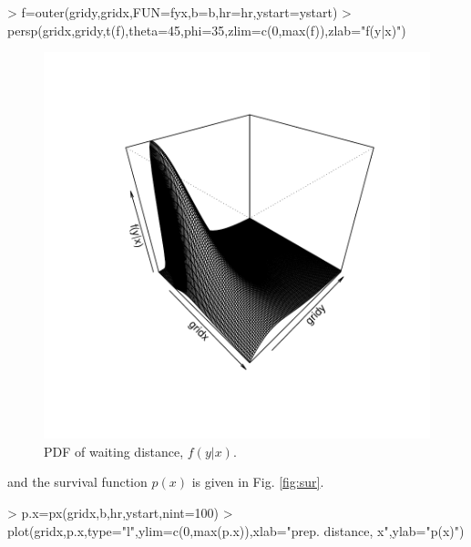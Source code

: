 \documentclass{article}
\begin{document}
\begin{Schunk}
\begin{Sinput}
> f=outer(gridy,gridx,FUN=fyx,b=b,hr=hr,ystart=ystart)
> persp(gridx,gridy,t(f),theta=45,phi=35,zlim=c(0,max(f)),zlab="f(y|x)")
\end{Sinput}
\end{Schunk}
\begin{figure}
\begin{centering}
\includegraphics{simulations-figwait}

\caption{PDF of waiting distance, $f(y|x)$.} \label{fig:wait}
\end{centering}
\end{figure}
and the survival function $p(x)$ is given in Fig. \ref{fig:sur}.
\begin{Schunk}
\begin{Sinput}
> p.x=px(gridx,b,hr,ystart,nint=100)
> plot(gridx,p.x,type="l",ylim=c(0,max(p.x)),xlab="prep. distance, x",ylab="p(x)")
\end{Sinput}
\end{Schunk}
\end{document}
